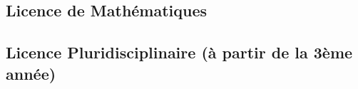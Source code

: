 \documentclass[10pt, a5paper]{report}
\begin{document}
\begin{spacing}{1.5}

\chapter*{Licence de Mathématiques}

\vfill
\section*{Licence Pluridisciplinaire (à partir de la 3ème année)}
\vfill


\end{spacing}
\end{document}
